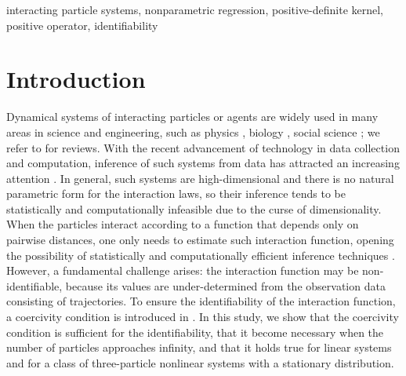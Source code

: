 \documentclass[]{elsarticle}
\numberwithin{equation}{section}
\numberwithin{theorem}{section}
\begin{document}
\begin{frontmatter}
\begin{keyword}
interacting particle systems, nonparametric regression, positive-definite kernel, positive operator, identifiability

\end{keyword}

\end{frontmatter}

\linenumbers
\tableofcontents
\section{Introduction}

Dynamical systems of interacting particles or agents are widely used in many areas in science and engineering, such as physics \cite{DOCBC2006}, biology \cite{bernoff2013nonlocal}, social science \cite{motsch2014heterophilious,BT2015}; we refer to \cite{vicsek2012collective,carrillo2017review} for reviews. With the recent advancement of technology in data collection and computation, inference of such systems from data has attracted an increasing attention \cite{herbert2011inferring, casadiego2017model, huang2019learning}. In general, such systems are high-dimensional and there is no natural parametric form for the interaction laws, so their inference tends to be statistically and computationally infeasible due to the curse of dimensionality. When the particles interact according to a function that depends only on pairwise distances, one only needs to estimate such interaction function, opening the possibility of statistically and computationally efficient inference techniques \cite{BFHM17,LZTM19, LMT19}. However, a fundamental challenge arises: the interaction function may be non-identifiable, because its values are under-determined from the observation data consisting of trajectories. To ensure the identifiability of the interaction function, a coercivity condition is introduced in \cite{BFHM17,LZTM19,LMT19}. In this study, we show that the coercivity condition is sufficient for the identifiability, that it become necessary when the number of particles approaches infinity, and that it holds true for linear systems and for a class of three-particle nonlinear systems with a stationary distribution. 
\end{document}

